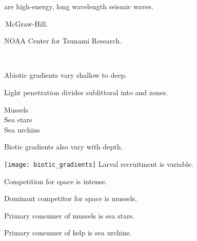 \documentclass[t]{beamer}
\begin{document}
{
\begin{frame}[b]{ are high-energy, long wavelength seismic waves.}

\hfill\tiny\textcopyright\,McGraw-Hill.
\end{frame}
}


{
\begin{frame}[b]

\hfill\tiny NOAA Center for Tsunami Research.
\end{frame}
}



{
\begin{frame}[b]

\hfill\tiny\textcolor{white}{Sue Scott, Darwin Initiative, Flickr Creative Commons.}
\end{frame}
}

{
\begin{frame}[t]{Abiotic gradients vary shallow to deep.}

\end{frame}
}

{
\begin{frame}[t]{Light penetration divides sublittoral into  and  zones.}

\vspace{13mm}
\hspace{97mm} Mussels \\
\hspace{97mm} Sea stars \\
\hspace{97mm} Sea urchins

\end{frame}
}

\begin{frame}[t]{Biotic gradients also vary with depth.}
\begin{multicols}{2}
	\texttt{[image: biotic\_gradients]}
\columnbreak
	\hangpara Larval recruitment is variable.
	
	\hangpara Competition for space is intense.
	
	\hangpara Dominant competitor for space is mussels.

	\hangpara Primary consumer of mussels is sea stars.

	\hangpara Primary consumer of kelp is sea urchins.
	
\end{multicols}
\end{frame}
\end{document}
